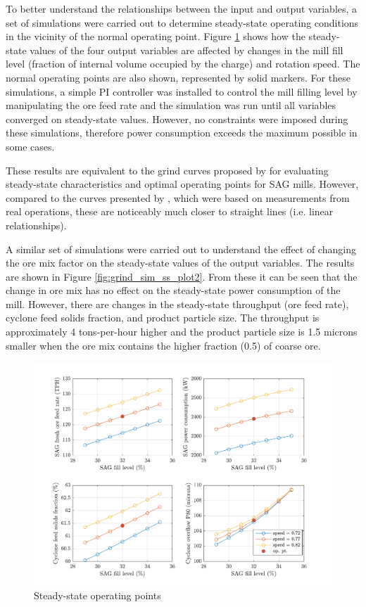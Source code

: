 To better understand the relationships between the input and output variables, a set of simulations were carried out to determine steady-state operating conditions in the vicinity of the normal operating point. Figure \ref{fig:grind_sim_ss_plot1} shows how the steady-state values of the four output variables are affected by changes in the mill fill level (fraction of internal volume occupied by the charge) and rotation speed. The normal operating points are also shown, represented by solid markers. For these simulations, a simple PI controller was installed to control the mill filling level by manipulating the ore feed rate and the simulation was run until all variables converged on steady-state values. However, no constraints were imposed during these simulations, therefore power consumption exceeds the maximum possible in some cases.

These results are equivalent to the grind curves proposed by \cite{powell_applying_2009} for evaluating steady-state characteristics and optimal operating points for SAG mills. However, compared to the curves presented by \cite{powell_applying_2009}, which were based on measurements from real operations, these are noticeably much closer to straight lines (i.e. linear relationships).

A similar set of simulations were carried out to understand the effect of changing the ore mix factor on the steady-state values of the output variables. The results are shown in Figure \ref{fig:grind_sim_ss_plot2}. From these it can be seen that the change in ore mix has no effect on the steady-state power consumption of the mill. However, there are changes in the steady-state throughput (ore feed rate), cyclone feed solids fraction, and product particle size. The throughput is approximately 4 tons-per-hour higher and the product particle size is 1.5 microns smaller when the ore mix contains the higher fraction (0.5) of coarse ore.

\begin{figure}[htp]
	\centering
	\includegraphics[width=15cm]{images/grind_sim_ss_plot1.pdf}
	\caption{Steady-state operating points}
	\label{fig:grind_sim_ss_plot1}
\end{figure}

